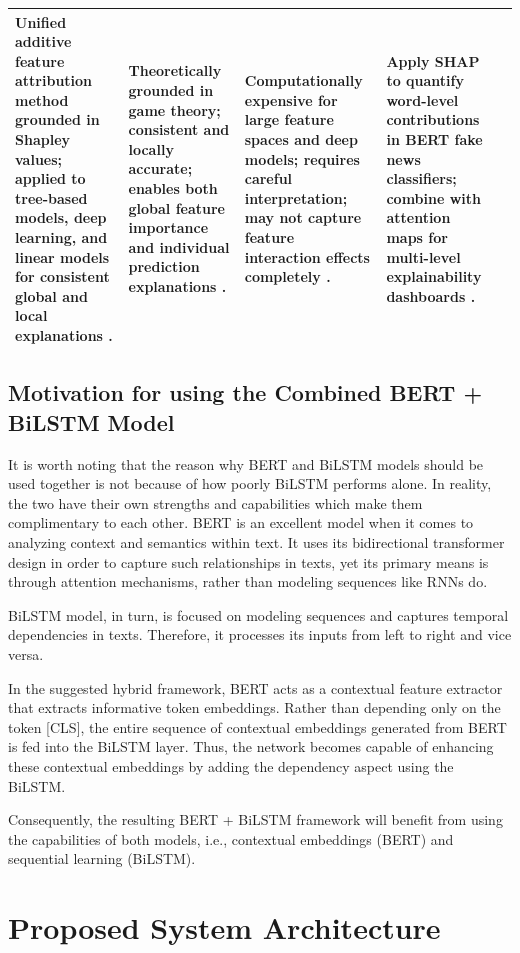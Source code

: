 \documentclass[runningheads]{llncs}
\begin{document}
\begin{longtable}{|p{}|p{}|p{}|p{}|p{}|}
Unified additive feature attribution method grounded in Shapley values; applied to tree-based models, deep learning, and linear models for consistent global and local explanations \cite{Lundberg2017SHAP}. &
Theoretically grounded in game theory; consistent and locally accurate; enables both global feature importance and individual prediction explanations \cite{Lundberg2017SHAP}. &
Computationally expensive for large feature spaces and deep models; requires careful interpretation; may not capture feature interaction effects completely \cite{Lundberg2017SHAP}. &
Apply SHAP to quantify word-level contributions in BERT fake news classifiers; combine with attention maps for multi-level explainability dashboards \cite{Lundberg2017SHAP}. \\ \hline
\end{longtable}

\subsection{Motivation for using the Combined BERT + BiLSTM Model}

It is worth noting that the reason why BERT and BiLSTM models should be used together is not because of how poorly BiLSTM performs alone. In reality, the two have their own strengths and capabilities which make them complimentary to each other. BERT is an excellent model when it comes to analyzing context and semantics within text. It uses its bidirectional transformer design in order to capture such relationships in texts, yet its primary means is through attention mechanisms, rather than modeling sequences like RNNs do.

BiLSTM model, in turn, is focused on modeling sequences and captures temporal dependencies in texts. Therefore, it processes its inputs from left to right and vice versa.

In the suggested hybrid framework, BERT acts as a contextual feature extractor that extracts informative token embeddings. Rather than depending only on the token [CLS], the entire sequence of contextual embeddings generated from BERT is fed into the BiLSTM layer. Thus, the network becomes capable of enhancing these contextual embeddings by adding the dependency aspect using the BiLSTM.

Consequently, the resulting BERT + BiLSTM framework will benefit from using the capabilities of both models, i.e., contextual embeddings (BERT) and sequential learning (BiLSTM).

\section{Proposed System Architecture}
\end{document}
